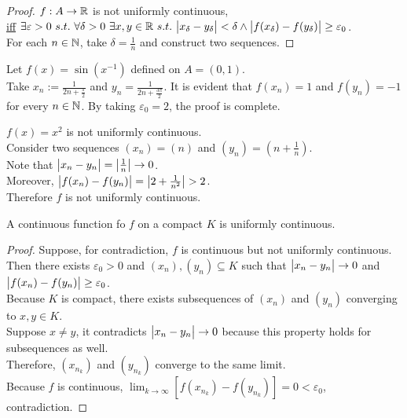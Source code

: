 \documentclass[11pt]{article}
\begin{document}
	\begin{proof}
		$f: A \to \mathbb{R}$ is not uniformly continuous, \\
		\ul{iff} $\exists \varepsilon > 0\ s.t.\ \forall \delta > 0\ \exists x, y \in \R\ s.t.\ \abs{x_\delta - y_\delta} < \delta \land \abs{f(x_\delta) - f(y_\delta)} \geq \varepsilon_0$. \\
		For each $n \in \mathbb{N}$, take $\delta = \frac{1}{n}$ and construct two sequences.
	\end{proof}
	
	\begin{example}
		Let $f(x) = \sin(x^{-1})$ defined on $A = (0, 1)$. \\
		Take $x_n := \frac{1}{2n + \frac{\pi}{2}}$ and $y_n = \frac{1}{2n + \frac{3\pi}{2}}$. It is evident that $f(x_n) = 1$ and $f(y_n) = -1$ for every $n \in \mathbb{N}$. By taking $\varepsilon_0 = 2$, the proof is complete.
	\end{example}
	
	\begin{example}
		$f(x) = x^2$ is not uniformly continuous. \\
		Consider two sequences $(x_n) = (n)$ and $(y_n) = \left (n + \frac{1}{n} \right )$. \\
		Note that $\big \vert {x_n - y_n} \big \vert = \big \vert {\frac{1}{n}} \big \vert \to 0$. \\
		Moreover, $\big \vert {f(x_n) - f(y_n)} \big \vert = \big \vert {2 + \frac{1}{n^2}} \big \vert > 2$. \\
		Therefore $f$ is not uniformly continuous.
	\end{example}
	
	\begin{theorem}
		A continuous function fo $f$ on a compact $K$ is uniformly continuous.
	\end{theorem}
	
	\begin{proof}
		Suppose, for contradiction, $f$ is continuous but not uniformly continuous. \\
		Then there exists $\varepsilon_0 > 0$ and $(x_n), (y_n) \subseteq K$ such that $\big \vert {x_n - y_n} \big \vert \to 0$ and $\big \vert {f(x_n) - f(y_n)} \big \vert \geq \varepsilon_0$. \\
		Because $K$ is compact, there exists subsequences of $(x_n)$ and $(y_n)$ converging to $x, y \in K$. \\
		Suppose $x \neq y$, it contradicts $\big \vert {x_n - y_n} \big \vert \to 0$ because this property holds for subsequences as well. \\
		Therefore, $(x_{n_k})$ and $(y_{n_k})$ converge to the same limit. \\
		Because $f$ is continuous, $\lim_{k \to \infty} [f(x_{n_k}) - f(y_{n_k})] = 0 < \varepsilon_0$, contradiction.
	\end{proof}
	
\end{document}
